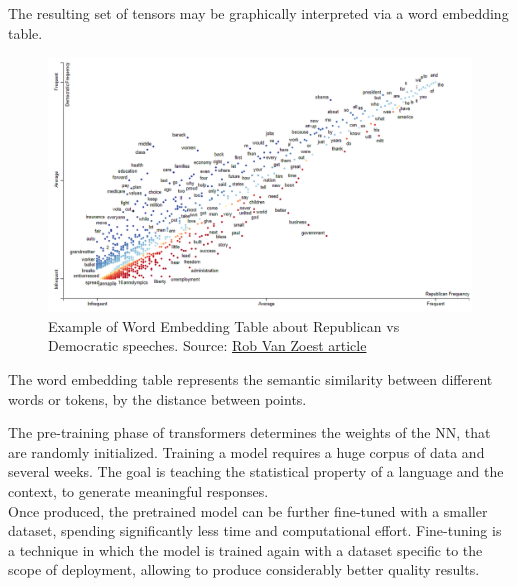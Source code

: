 \documentclass[12pt]{article}
\begin{document}
\vspace{2mm}

The resulting set of tensors may be graphically interpreted via a word embedding table.
    \begin{figure}[H]
    \centering
            \includegraphics[width=1\textwidth]{WordEmbeddingTableEx.png}
    \caption[Example of Word Embedding Table]{Example of Word Embedding Table about Republican vs Democratic speeches. Source: \href{https://www.innerdoc.com/periodic-table-of-nlp-tasks/78-word-embedding-visualization/}{Rob Van Zoest article}}
    \end{figure}
\noindent The word embedding table represents the semantic similarity between different words or tokens, by the distance between points.


\vspace{2mm}

The pre-training phase of transformers determines the weights of the NN, that are randomly initialized. Training a model requires a huge corpus of data and several weeks. The goal is teaching the statistical property of a language and the context, to generate meaningful responses.\\ 
Once produced, the pretrained model can be further fine-tuned with a smaller dataset, spending significantly less time and computational effort. Fine-tuning is a technique in which the model is trained again with a dataset specific to the scope of deployment, allowing to produce considerably better quality results.\\
\end{document}
